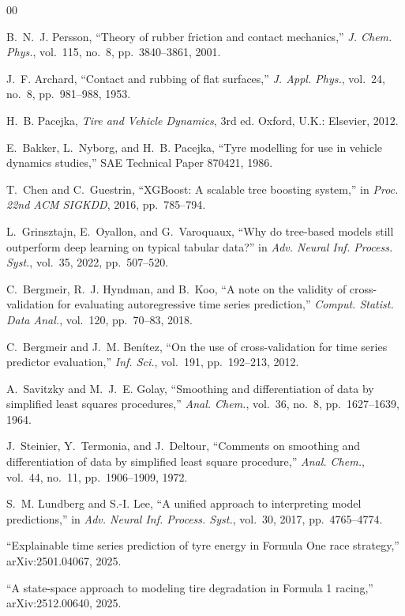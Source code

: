 \documentclass[conference]{IEEEtran}
\begin{document}
\begin{thebibliography}{00}

 B.~N.~J. Persson, ``Theory of rubber friction and contact
mechanics,'' \emph{J. Chem. Phys.}, vol.~115, no.~8, pp.~3840--3861, 2001.

 J.~F. Archard, ``Contact and rubbing of flat surfaces,''
\emph{J. Appl. Phys.}, vol.~24, no.~8, pp.~981--988, 1953.

 H.~B. Pacejka, \emph{Tire and Vehicle Dynamics}, 3rd ed.
Oxford, U.K.: Elsevier, 2012.

 E.~Bakker, L.~Nyborg, and H.~B. Pacejka, ``Tyre modelling
for use in vehicle dynamics studies,'' SAE Technical Paper 870421, 1986.

 T.~Chen and C.~Guestrin, ``XGBoost: A scalable tree boosting
system,'' in \emph{Proc. 22nd ACM SIGKDD}, 2016, pp.~785--794.

 L.~Grinsztajn, E.~Oyallon, and G.~Varoquaux, ``Why do
tree-based models still outperform deep learning on typical tabular data?'' in
\emph{Adv. Neural Inf. Process. Syst.}, vol.~35, 2022, pp.~507--520.

 C.~Bergmeir, R.~J. Hyndman, and B.~Koo, ``A note on the
validity of cross-validation for evaluating autoregressive time series
prediction,'' \emph{Comput. Statist. Data Anal.}, vol.~120, pp.~70--83, 2018.

 C.~Bergmeir and J.~M. Ben\'{i}tez, ``On the use of
cross-validation for time series predictor evaluation,'' \emph{Inf. Sci.},
vol.~191, pp.~192--213, 2012.

 A.~Savitzky and M.~J.~E. Golay, ``Smoothing and
differentiation of data by simplified least squares procedures,'' \emph{Anal.
Chem.}, vol.~36, no.~8, pp.~1627--1639, 1964.

 J.~Steinier, Y.~Termonia, and J.~Deltour, ``Comments on
smoothing and differentiation of data by simplified least square procedure,''
\emph{Anal. Chem.}, vol.~44, no.~11, pp.~1906--1909, 1972.

 S.~M. Lundberg and S.-I. Lee, ``A unified approach to
interpreting model predictions,'' in \emph{Adv. Neural Inf. Process. Syst.},
vol.~30, 2017, pp.~4765--4774.

 ``Explainable time series prediction of tyre energy in
Formula One race strategy,'' arXiv:2501.04067, 2025.

 ``A state-space approach to modeling tire degradation
in Formula 1 racing,'' arXiv:2512.00640, 2025.

\end{thebibliography}
\end{document}
